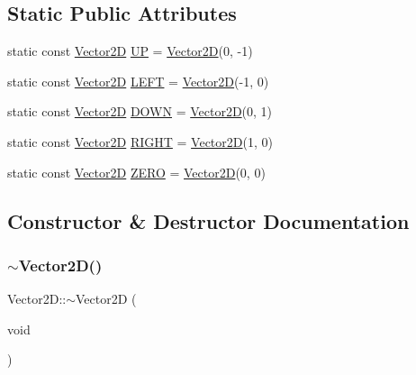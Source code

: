 \subsection*{Static Public Attributes}
\begin{DoxyCompactItemize}
\item 
static const \hyperlink{class_vector2_d}{Vector2D} \hyperlink{class_vector2_d_abd688d20c24b9d6fca4378e3c65e37dc}{UP} = \hyperlink{class_vector2_d}{Vector2D}(0, -\/1)
\item 
static const \hyperlink{class_vector2_d}{Vector2D} \hyperlink{class_vector2_d_a88282ec1acd645ccd8195c9c624c2607}{L\+E\+FT} = \hyperlink{class_vector2_d}{Vector2D}(-\/1, 0)
\item 
static const \hyperlink{class_vector2_d}{Vector2D} \hyperlink{class_vector2_d_a7c995f75e1c94be2be0d4cc930dad709}{D\+O\+WN} = \hyperlink{class_vector2_d}{Vector2D}(0, 1)
\item 
static const \hyperlink{class_vector2_d}{Vector2D} \hyperlink{class_vector2_d_a066be8679c3ac8b38a42b3384aadf76f}{R\+I\+G\+HT} = \hyperlink{class_vector2_d}{Vector2D}(1, 0)
\item 
static const \hyperlink{class_vector2_d}{Vector2D} \hyperlink{class_vector2_d_ab9f4481b021711cbbd4ec78390aa1e6e}{Z\+E\+RO} = \hyperlink{class_vector2_d}{Vector2D}(0, 0)
\end{DoxyCompactItemize}


\subsection{Constructor \& Destructor Documentation}
\hypertarget{class_vector2_d_a519c8120da5581b006fba4d01b243bc1}{}\label{class_vector2_d_a519c8120da5581b006fba4d01b243bc1} 
\subsubsection{\texorpdfstring{$\sim$\+Vector2\+D()}{~Vector2D()}}
{\footnotesize\ttfamily Vector2\+D\+::$\sim$\+Vector2D (\begin{DoxyParamCaption}\item[{void}]{ }\end{DoxyParamCaption})}

\hypertarget{class_vector2_d_a98e9997ebb7a629f4db52397d4e0d653}{}\label{class_vector2_d_a98e9997ebb7a629f4db52397d4e0d653} 
